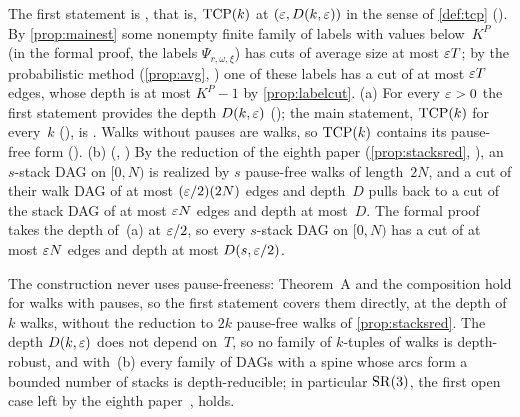 \begin{outline}
The first statement is , that is, $\mathrm{TCP}(k)$ at $(\varepsilon,D(k,\varepsilon))$ in the sense of \cref{def:tcp}
(). By \cref{prop:mainest} some nonempty finite family of labels with values below~$K^P$ (in the formal
proof, the labels $\Psi_{r,\omega,\xi}$) has cuts of average size at most $\varepsilon T$; by the probabilistic method (\cref{prop:avg},
) one of these labels has a cut of at most $\varepsilon T$ edges, whose depth is at most $K^P-1$ by
\cref{prop:labelcut}. (a) For every $\varepsilon>0$ the first statement provides
the depth $D(k,\varepsilon)$ (); the main statement, $\mathrm{TCP}(k)$ for every~$k$ (), is . Walks
without pauses are walks, so $\mathrm{TCP}(k)$ contains its pause-free form (). (b) (,
) By the reduction of the eighth paper (\cref{prop:stacksred}, ), an $s$-stack
DAG on $[0,N)$ is realized by $s$ pause-free walks of length~$2N$, and a cut of their walk DAG of at most $(\varepsilon/2)(2N)$ edges and
depth~$D$ pulls back to a cut of the stack DAG of at most $\varepsilon N$ edges and depth at most~$D$. The formal proof takes the depth
of~(a) at $\varepsilon/2$, so every $s$-stack DAG on $[0,N)$ has a cut of at most $\varepsilon N$ edges and depth at most $D(s,\varepsilon/2)$.
\end{outline}

The construction never uses pause-freeness: Theorem~A and the composition hold for walks with pauses, so the first statement covers
them directly, at the depth of $k$ walks, without the reduction to $2k$ pause-free walks of \cref{prop:stacksred}. The depth
$D(k,\varepsilon)$ does not depend on~$T$, so no family of $k$-tuples of walks is depth-robust, and with~(b) every family of DAGs with a
spine whose arcs form a bounded number of stacks is depth-reducible; in particular $\mathrm{SR}(3)$, the first open case left by the
eighth paper~\cite[Problem~10.2]{EighthPaper2026}, holds.
